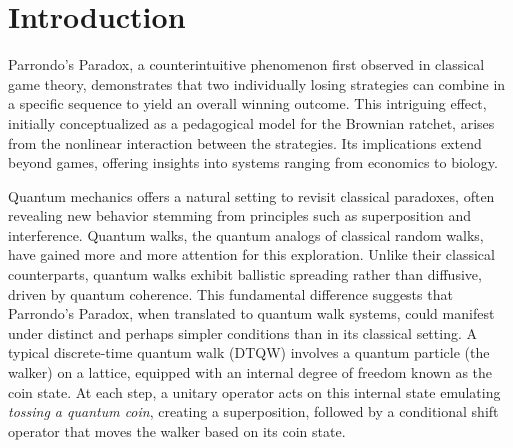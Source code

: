 \documentclass[11pt,letterpaper,twocolumn]{article} %
\begin{document}
\section{Introduction}

Parrondo's Paradox, a counterintuitive phenomenon first observed in classical
game theory, demonstrates that two individually losing strategies can combine
in a specific sequence to yield an overall winning outcome. This intriguing
effect, initially conceptualized as a pedagogical model for the Brownian
ratchet, arises from the nonlinear interaction between the strategies. Its
implications extend beyond games, offering insights into systems ranging from
economics to biology.

Quantum mechanics offers a natural setting to revisit classical paradoxes, often 
revealing new behavior stemming from principles such as superposition and 
interference. Quantum walks, the quantum analogs of classical random walks, 
have gained more and more attention for this exploration. 
Unlike their classical counterparts, quantum walks exhibit
ballistic spreading rather than diffusive, driven by quantum coherence.
This fundamental difference suggests that Parrondo's Paradox, when translated
to quantum walk systems, could manifest under distinct and perhaps simpler
conditions than in its classical setting. A typical discrete-time quantum
walk (DTQW) involves a quantum particle (the walker) on a lattice, equipped with an
internal degree of freedom known as the coin state. At each step, a
unitary operator acts on this internal state emulating \textit{tossing a quantum coin}, creating a
superposition, followed by a conditional shift operator that moves the
walker based on its coin state.
\end{document}
